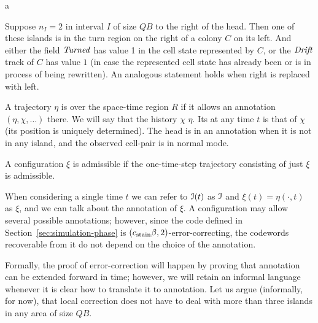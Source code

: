 \documentclass[11pt]{memoir}
\theoremstyle{definition} %
\newcommand{\fld}[1]{\ensuremath{\textit{#1\/}}}
\def\B{B}
\newcommand{\Q}{Q} %
\newcommand{\Drift}{\fld{Drift}}
\newcommand{\Turned}{\fld{Turned}} %
\newcommand{\cns}[1]{c_{\textrm{\upshape #1}}}
\begin{document}
\begin{definition}[Annotation]
\begin{varenum}[series=annotated]{a}
  \item\label{i:two-islands}
    Suppose \( n_{I}=2 \) in interval \( I \) of size \( \Q\B \) to the right of the head.
    Then one of these islands is in the turn region on the right of a colony \( C \) on its left.
    And either the field \( \Turned \) has value 1 in the cell state represented by \( C \), 
    or the \( \Drift \) track of \( C \) has value \( 1 \) (in case the represented cell state has already
    been or is in process of being rewritten).
    An analogous statement holds when right is replaced with left.
  \end{varenum}

  A trajectory \( \eta \) is  over the space-time region \( R \) if it allows an annotation
  \( (\eta,\chi,\dots) \)  there.
  We will say that the history \( \chi \)  \( \eta \).
  Its  at any time \( t \) is that of \( \chi \) (its position is uniquely determined).
  The head is  in an annotation
  when it is not in any island, and the observed cell-pair is in normal mode.

  A configuration \( \xi \) is admissible if the one-time-step trajectory
  consisting of just \( \xi \) is admissible.
\end{definition}

When considering a single time \( t \)
we can refer to \( \mathcal{I}(t) \) as \( \mathcal{I} \) and \( \xi(t)=\eta(\cdot,t) \) as \( \xi \),
and we can talk about the annotation of \( \xi \).
A configuration may allow several possible annotations;
however, since the code defined in Section~\ref{sec:simulation-phase}
is \( (\cns{stain}\beta,2) \)-error-correcting, 
the codewords recoverable from it do not depend on the choice of the annotation.

Formally, the proof of error-correction will happen by proving that
annotation can be extended forward in time; however, we will retain an informal language
whenever it is clear how to translate it to annotation.
Let us argue (informally, for now), that local correction
does not have to deal with more than three islands in any area of size \( \Q\B \). 
\end{document}
